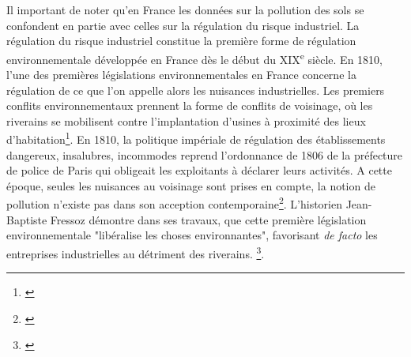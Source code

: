 \documentclass[a4paper,twoside,12pt]{book}
\newcommand{\siecle}[1]{\textsc{#1}\textsuperscript{e} siècle}
\begin{document}
Il important de noter qu'en France les données sur la pollution des sols se confondent en partie avec celles sur la régulation du risque industriel. La régulation du risque industriel constitue la première forme de régulation environnementale développée en France dès le début du \siecle{XIX}. En 1810, l’une des premières législations environnementales en France concerne la régulation de ce que l’on appelle alors les nuisances industrielles. Les premiers conflits environnementaux prennent la forme de conflits de voisinage, où les riverains se mobilisent contre l’implantation d’usines à proximité des lieux d’habitation\footnote{\cite{jarrige_contamination_2017}}. En 1810, la politique impériale de régulation des établissements \og{} dangereux, insalubres, incommodes\fg{} reprend l’ordonnance de 1806 de la préfecture de police de Paris qui obligeait les exploitants à déclarer leurs activités. A cette époque, seules les nuisances au voisinage sont prises en compte, la notion de pollution n’existe pas dans son acception contemporaine\footnote{\cite{bernhardt_demon_2002}}. L'historien Jean-Baptiste Fressoz démontre dans ses travaux, que cette première législation environnementale "libéralise les choses environnantes", favorisant \textit{de facto} les entreprises industrielles au détriment des riverains. \footnote{\cite{fressoz_decret_2011}}. 
\end{document}
